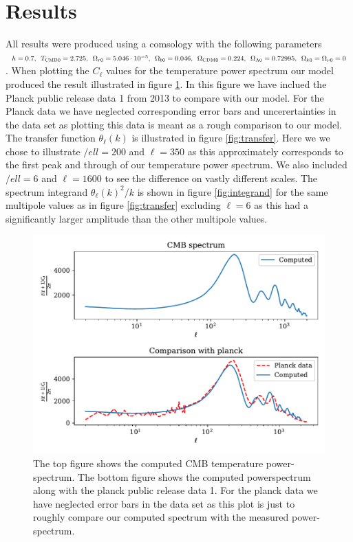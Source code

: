 \documentclass[onecolumn]{aastex62}
\begin{document}
\section{Results}
\label{sec:results}
All results were produced using a comsology with the following parameters $h =
0.7,\,\,\,T_{\rm CMB 0} = 2.725,\,\,\,\Omega_{r0} = 5.046\cdot
10^{-5},\,\,\,\Omega_{b0}=0.046,\,\,\,\Omega_{\rm CDM 0} =
0.224,\,\,\,\Omega_{\Lambda 0} = 0.72995,\,\,\,\Omega_{k0} = \Omega_{\nu 0} =
0$. When plotting the $C_\ell$ values for the temperature power spectrum our
model produced the result illustrated in figure \ref{fig:cell}. In this figure
we have inclued the Planck public release data 1 from 2013 to compare with our
model. For the Planck data we have neglected corresponding error bars and
uncerertainties in the data set as plotting this data is meant as a rough
comparison to our model. The transfer function $\theta_\ell(k)$ is illustrated
in figure \ref{fig:transfer}. Here we we chose to illustrate $/ell=200$ and
$\ell=350$ as this approximately corresponds to the first peak and through of
our temperature power spectrum. We also included $/ell=6$ and $\ell=1600$ to see
the difference on vastly different scales. The spectrum integrand
$\theta_\ell(k)^2/k$ is shown in figure \ref{fig:integrand} for the same
multipole values as in figure \ref{fig:transfer} excluding $\ell=6$ as this had
a significantly larger amplitude than the other multipole values.\\
\begin{figure}
    \includegraphics[scale=0.8]{figures/comparison.pdf}
    \caption{The top figure shows the computed CMB temperature power-spectrum. The bottom figure shows the computed powerspectrum along with the planck public release data 1. For the planck data we have neglected error bars in the data set as this plot is just to roughly compare our computed spectrum with the measured power-spectrum.}
    \label{fig:cell}
\end{figure}
\end{document}
